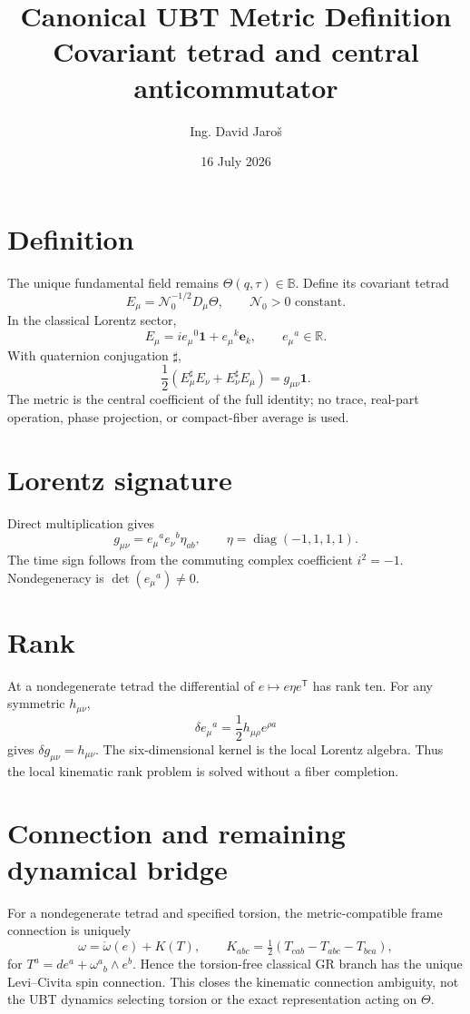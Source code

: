 \documentclass[11pt,a4paper]{article}
\title{Canonical UBT Metric Definition\\\large Covariant tetrad and central anticommutator}
\author{Ing. David Jaroš}
\date{16 July 2026}
\begin{document}
\maketitle

\section{Definition}
The unique fundamental field remains $\Theta(q,\tau)\in\mathbb B$.  Define its
covariant tetrad
\[
 E_\mu=\mathcal N_0^{-1/2}D_\mu\Theta,
 \qquad \mathcal N_0>0\text{ constant}.
\]
In the classical Lorentz sector,
\[
 E_\mu=i e_\mu{}^0\mathbf1+e_\mu{}^k\mathbf e_k,
 \qquad e_\mu{}^a\in\mathbb R.
\]
With quaternion conjugation $\sharp$,
\begin{equation}
 \boxed{\frac12(E_\mu^\sharp E_\nu+E_\nu^\sharp E_\mu)
       =g_{\mu\nu}\mathbf1.}
\end{equation}
The metric is the central coefficient of the full identity; no trace,
real-part operation, phase projection, or compact-fiber average is used.

\section{Lorentz signature}
Direct multiplication gives
\[
 g_{\mu\nu}=e_\mu{}^a e_\nu{}^b\eta_{ab},
 \qquad \eta=\operatorname{diag}(-1,1,1,1).
\]
The time sign follows from the commuting complex coefficient $i^2=-1$.
Nondegeneracy is $\det(e_\mu{}^a)\ne0$.

\section{Rank}
At a nondegenerate tetrad the differential of $e\mapsto e\eta e^{\mathsf T}$
has rank ten.  For any symmetric $h_{\mu\nu}$,
\[
 \delta e_\mu{}^a=\frac12h_{\mu\rho}e^{\rho a}
\]
gives $\delta g_{\mu\nu}=h_{\mu\nu}$.  The six-dimensional kernel is the
local Lorentz algebra.  Thus the local kinematic rank problem is solved without
a fiber completion.

\section{Connection and remaining dynamical bridge}
For a nondegenerate tetrad and specified torsion, the metric-compatible frame
connection is uniquely
\[
 \omega=\mathring\omega(e)+K(T),
 \qquad K_{abc}=\tfrac12(T_{cab}-T_{abc}-T_{bca}),
\]
for $T^a=de^a+\omega^a{}_b\wedge e^b$. Hence the torsion-free classical GR
branch has the unique Levi--Civita spin connection. This closes the kinematic
connection ambiguity, not the UBT dynamics selecting torsion or the exact
representation acting on $\Theta$.
\end{document}
